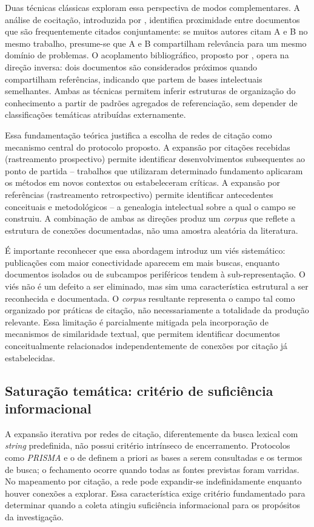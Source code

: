 \documentclass[portuguese]{textolivre}
\begin{document}
	Duas técnicas clássicas exploram essa perspectiva de modos complementares. A análise de cocitação, introduzida por \textcite{Small1973}, identifica proximidade entre documentos que são frequentemente citados conjuntamente: se muitos autores citam A e B no mesmo trabalho, presume-se que A e B compartilham relevância para um mesmo domínio de problemas. O acoplamento bibliográfico, proposto por \textcite{Kessler1963}, opera na direção inversa: dois documentos são considerados próximos quando compartilham referências, indicando que partem de bases intelectuais semelhantes. Ambas as técnicas permitem inferir estruturas de organização do conhecimento a partir de padrões agregados de referenciação, sem depender de classificações temáticas atribuídas externamente.
    
	Essa fundamentação teórica justifica a escolha de redes de citação como mecanismo central do protocolo proposto. A expansão por citações recebidas (rastreamento prospectivo) permite identificar desenvolvimentos subsequentes ao ponto de partida – trabalhos que utilizaram determinado fundamento aplicaram os métodos em novos contextos ou estabeleceram críticas. A expansão por referências (rastreamento retrospectivo) permite identificar antecedentes conceituais e metodológicos – a genealogia intelectual sobre a qual o campo se construiu. A combinação de ambas as direções produz um \textit{corpus} que reflete a estrutura de conexões documentadas, não uma amostra aleatória da literatura.
    
	É importante reconhecer que essa abordagem introduz um viés sistemático: publicações com maior conectividade aparecem em mais buscas, enquanto documentos isolados ou de subcampos periféricos tendem à sub-representação. O viés não é um defeito a ser eliminado, mas sim uma característica estrutural a ser reconhecida e documentada. O \textit{corpus} resultante representa o campo tal como organizado por práticas de citação, não necessariamente a totalidade da produção relevante. Essa limitação é parcialmente mitigada pela incorporação de mecanismos de similaridade textual, que permitem identificar documentos conceitualmente relacionados independentemente de conexões por citação já estabelecidas.


\subsection{Saturação temática: critério de suficiência informacional}\label{sec-formato}
A expansão iterativa por redes de citação, diferentemente da busca lexical com \textit{string} predefinida, não possui critério intrínseco de encerramento. Protocolos como \textit{PRISMA} e o de \textcite{Kitchenham2007} definem a priori as bases a serem consultadas e os termos de busca; o fechamento ocorre quando todas as fontes previstas foram varridas. No mapeamento por citação, a rede pode expandir-se indefinidamente enquanto houver conexões a explorar. Essa característica exige critério fundamentado para determinar quando a coleta atingiu suficiência informacional para os propósitos da investigação.
\end{document}

